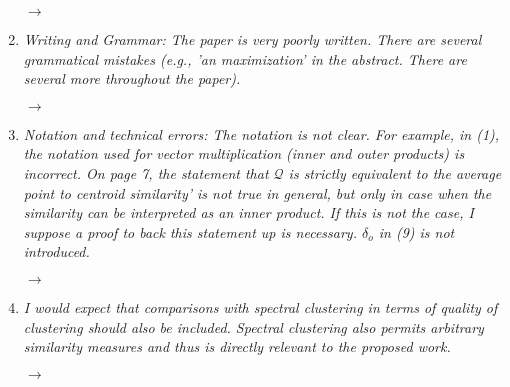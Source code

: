 \documentclass[10pt]{article}
\begin{document}
\begin{enumerate}
$\rightarrow$

\item \emph{Writing and Grammar: The paper is very poorly written. There are several grammatical mistakes (e.g., 'an maximization' in the abstract. There are several more throughout the paper).}

$\rightarrow$

\item \emph{Notation and technical errors:
The notation is not clear. For example, in (1), the notation used for vector multiplication (inner and outer products) is incorrect. On page 7, the statement that $\mathcal{Q}$ is strictly equivalent to the average point to centroid similarity' is not true in general, but only in case when the similarity can be interpreted as an inner product. If this is not the case, I suppose a proof to back this statement up is necessary. $\delta_o$ in (9) is not introduced.}

$\rightarrow$

\item \emph{I would expect that comparisons with spectral clustering in terms of quality of clustering should also be included. Spectral clustering also permits arbitrary similarity measures and thus is directly relevant to the proposed work.}

$\rightarrow$

\end{enumerate}
\end{document}
